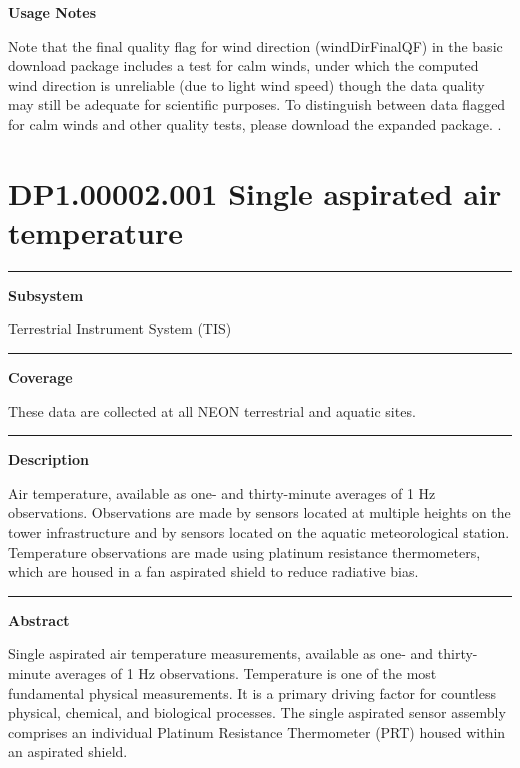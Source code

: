 \documentclass[]{article}
\begin{document}
\textbf{Usage Notes}

Note that the final quality flag for wind direction (windDirFinalQF) in
the basic download package includes a test for calm winds, under which
the computed wind direction is unreliable (due to light wind speed)
though the data quality may still be adequate for scientific purposes.
To distinguish between data flagged for calm winds and other quality
tests, please download the expanded package. \newpage
.

\section{DP1.00002.001 Single aspirated air
temperature}\label{dp1.00002.001-single-aspirated-air-temperature}

\begin{center}\rule{0.5\linewidth}{\linethickness}\end{center}

\textbf{Subsystem}

Terrestrial Instrument System (TIS)

\begin{center}\rule{0.5\linewidth}{\linethickness}\end{center}

\textbf{Coverage}

These data are collected at all NEON terrestrial and aquatic sites.

\begin{center}\rule{0.5\linewidth}{\linethickness}\end{center}

\textbf{Description}

Air temperature, available as one- and thirty-minute averages of 1 Hz
observations. Observations are made by sensors located at multiple
heights on the tower infrastructure and by sensors located on the
aquatic meteorological station. Temperature observations are made using
platinum resistance thermometers, which are housed in a fan aspirated
shield to reduce radiative bias.

\begin{center}\rule{0.5\linewidth}{\linethickness}\end{center}

\textbf{Abstract}

Single aspirated air temperature measurements, available as one- and
thirty-minute averages of 1 Hz observations. Temperature is one of the
most fundamental physical measurements. It is a primary driving factor
for countless physical, chemical, and biological processes. The single
aspirated sensor assembly comprises an individual Platinum Resistance
Thermometer (PRT) housed within an aspirated shield.
\end{document}
